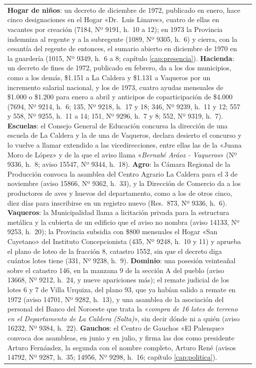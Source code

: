 \begin{longtable}{@{}p{2.7cm}p{10.3cm}@{}}
\textbf{Hogar de niños}: un decreto de diciembre de 1972, publicado en enero, hace cinco designaciones en el Hogar «Dr.\ Luis Linares», cuatro de ellas en vacantes por creación (7184, Nº 9191, h.\ 10 a 12); en 1973 la Provincia indemniza al regente y a la subregente (1089, Nº 9305, h.\ 6) y cierra, con la cesantía del regente de entonces, el sumario abierto en diciembre de 1970 en la guardería (1015, Nº 9349, h.\ 6 a 8; capítulo \ref{cap:presencia}). \textbf{Hacienda}: un decreto de fines de 1972, publicado en febrero, da a los dos municipios, como a los demás, \$1.151 a La Caldera y \$1.131 a Vaqueros por un incremento salarial nacional, y los de 1973, cuatro ayudas mensuales de \$1.000 o \$1.200 para enero a abril y anticipos de coparticipación de \$4.000 (7694, Nº 9214, h.\ 6; 135, Nº 9218, h.\ 17 y 18; 346, Nº 9239, h.\ 11 y 12; 557 y 558, Nº 9255, h.\ 11 a 14; 151, Nº 9296, h.\ 7 y 8; 552, Nº 9319, h.\ 7). \textbf{Escuelas}: el Consejo General de Educación concursa la dirección de una escuela de La Caldera y la de una de Vaqueros, declara desierto el concurso y lo vuelve a llamar extendido a las vicedirecciones, entre ellas las de la «Juana Moro de López» y de la que el aviso llama «\textit{Bernabé Aráoz - Vaqueros}» (Nº 9336, h.\ 8; aviso 15547, Nº 9344, h.\ 18). \textbf{Agro}: la Cámara Regional de la Producción convoca la asamblea del Centro Agrario La Caldera para el 3 de noviembre (aviso 15866, Nº 9362, h.\ 33), y la Dirección de Comercio da a los productores de aves y huevos del departamento, como a los de otros cinco, diez días para inscribirse en un registro nuevo (Res.\ 873, Nº 9336, h.\ 6). \textbf{Vaqueros}: la Municipalidad llama a licitación privada para la estructura metálica y la cubierta de un edificio que el aviso no nombra (aviso 14133, Nº 9253, h.\ 20); la Provincia subsidia con \$800 mensuales el Hogar «San Cayetano» del Instituto Concepcionista (435, Nº 9248, h.\ 10 y 11) y aprueba el plano de loteo de la fracción 8, catastro 1552, sin que el decreto diga cuántos lotes tiene (331, Nº 9238, h.\ 9). \textbf{Dominio}: una posesión veinteañal sobre el catastro 146, en la manzana 9 de la sección A del pueblo (aviso 13668, Nº 9212, h.\ 24, y nueve apariciones más); el remate judicial de los lotes 6 y 7 de Villa Urquiza, del plano 93, que ya habían salido a remate en 1972 (aviso 14701, Nº 9282, h.\ 13), y una asamblea de la asociación del personal del Banco del Noroeste que trata la «\textit{compra de 16 lotes de terreno en el Departamento de La Caldera (Salta)}», sin decir dónde ni a quién (aviso 16232, Nº 9384, h.\ 22). \textbf{Gauchos}: el Centro de Gauchos «El Palenque» convoca dos asambleas, en junio y en julio, y firma las dos como presidente Arturo Fernández, la segunda con el nombre completo, Arturo René (avisos 14792, Nº 9287, h.\ 35; 14956, Nº 9298, h.\ 16; capítulo \ref{cap:politica}). \\

\end{longtable}
